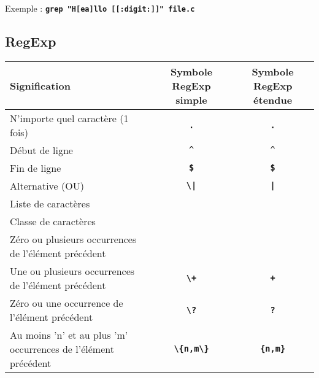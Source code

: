 \documentclass[11pt,a4paper]{article}
\newcommand{\TTBF}[1]{\texttt{\textbf{#1}}}	%
\begin{document}

\bigskip

\noindent Exemple : \TTBF{grep "H[ea]llo [[:digit:]]" file.c}

\newpage

\subsection{RegExp}

\bigskip


\begin{center}
	\begin{tabular}{ M{5cm} | c | c }
	\textbf{Signification} & \textbf{Symbole RegExp simple} & \textbf{Symbole RegExp étendue} \\  \hline
	N'importe quel caractère {} {} {} {} (1 fois) & \TTBF{\textquotesingle .\textquotesingle} & \TTBF{\textquotesingle .\textquotesingle} \\ \hline
	Début de ligne & \texttt{\textquotesingle \textasciicircum \textquotesingle} & \texttt{\textquotesingle \textasciicircum \textquotesingle} \\ \hline
	Fin de ligne & \TTBF{\textquotesingle \$\textquotesingle} & \TTBF{\textquotesingle \$\textquotesingle} \\ \hline
	Alternative (OU) & \TTBF{\textquotesingle \textbackslash |\textquotesingle} & \TTBF{\textquotesingle |\textquotesingle} \\ \hline
	Liste de caractères & \TTBF{\textquotesingle []\textquotesingle} & \TTBF{\textquotesingle []\textquotesingle} \\ \hline
	Classe de caractères & \TTBF{\textquotesingle [:classe:]\textquotesingle} & \TTBF{\textquotesingle [:classe:]\textquotesingle} \\ \hline
	Zéro ou plusieurs occurrences de l'élément précédent & \TTBF{\textquotesingle *\textquotesingle} & \TTBF{\textquotesingle *\textquotesingle} \\ \hline
	Une ou plusieurs occurrences de l'élément précédent & \TTBF{\textquotesingle \textbackslash +\textquotesingle} & \TTBF{\textquotesingle +\textquotesingle} \\ \hline
	Zéro ou une occurrence de l'élément précédent & \TTBF{\textquotesingle \textbackslash ?\textquotesingle} & \TTBF{\textquotesingle ?\textquotesingle} \\ \hline
	Au moins 'n' et au plus 'm' occurrences de l'élément précédent & \TTBF{\textquotesingle \textbackslash \{n,m\textbackslash \}\textquotesingle} & \TTBF{\textquotesingle \{n,m\}\textquotesingle} \\ \hline

\end{tabular}
\end{center}
\end{document}
